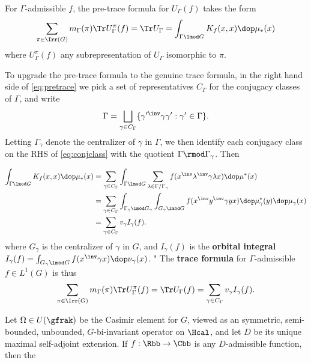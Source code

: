 For $\Gamma$-admissible $f$, the pre-trace formula for $U_\Gamma(f)$ takes the form
\begin{align}\label{eq:pretrace}
  \sum_{\pi \in \Irr(G)} m_\Gamma(\pi) \Tr U_\Gamma^\pi(f) = \Tr U_\Gamma =\int_{\Gamma \lmod G} K_f(x,x) \dop \mu_* (x)
\end{align}
where $U_\Gamma^\pi(f)$ any subrepresentation of $U_\Gamma$ isomorphic to $\pi$.

To upgrade the pre-trace formula to the genuine trace formula, in the right hand side of \ref{eq:pretrace} we pick a set of representatives $C_\Gamma$ for the conjugacy classes of $\Gamma$, and write
\begin{align}\label{eq:conjclass}
  \Gamma = \bigsqcup_{\gamma\in C_\Gamma} \{\gamma'^\inv \gamma \gamma' : \gamma' \in \Gamma\}.
\end{align}
Letting $\Gamma_\gamma$ denote the centralizer of $\gamma$ in $\Gamma$,  we then identify each conjugacy class on the RHS of \ref{eq:conjclass} with the quotient $\Gamma \rmod \Gamma_\gamma$.  Then

\begin{align}
  \int_{\Gamma \lmod G} K_f(x,x) \dop \mu_* (x) & = \sum_{\gamma \in C_\Gamma}\int_{\Gamma \lmod G} \sum_{\lambda \in \Gamma / \Gamma_\gamma}  f(x^\inv \lambda^\inv  \gamma \lambda x) \dop \mu^*(x)      \\
                                                & =\sum_{\gamma \in C_\Gamma} \int_{\Gamma_\gamma \lmod G_\gamma}\int_{G_\gamma \lmod G} f(x^\inv y^\inv  \gamma y x) \dop\mu^*_\gamma(y)\dop\mu_\gamma(x) \\
                                                & = \sum_{\gamma \in C_\Gamma} v_\gamma I_\gamma(f).
\end{align}
where $G_\gamma$ is the centralizer of $\gamma$ in $G$, and $I_\gamma(f)$ is the \textbf{orbital integral} $I_\gamma(f) = \int_{G_\gamma \lmod G} f(x^\inv \gamma x) \dop\nu_\gamma(x)$.
"
The \textbf{trace formula} for $\Gamma$-admissible $f \in L^1(G)$ is thus
\begin{align}
  \sum_{\pi \in \Irr(G)} m_\Gamma(\pi) \Tr U_\Gamma^\pi(f) = \Tr U_\Gamma(f) =   \sum_{\gamma \in C_\Gamma} v_\gamma I_\gamma(f).
\end{align}

\newpage

Let $\Omega \in U(\gfrak)$ be the Casimir element for $G$, viewed as an symmetric, semi-bounded, unbounded, $G$-bi-invariant operator on $\Hcal$, and let $D$ be its unique maximal self-adjoint extension. If $f : \Rbb \to \Cbb$ is any $D$-admissible function, then the


